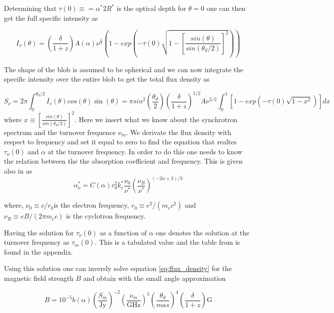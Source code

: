 Determining that $\tau(0) \equiv = \alpha^*2R^*$ is the optical depth for $\theta = 0$ one can then get the full specific intensity as

\begin{equation}
    I_\nu(\theta) = \left( \frac{\delta}{1+z}\right)A(\alpha)\nu^{\frac{5}{2}}\left(1-exp \left(-\tau(0)\sqrt{1-\left[\frac{sin(\theta)}{sin(\theta_d/2)}\right]^2}\right)\right)
\end{equation}

The shape of the blob is assumed to be spherical and we can now integrate the specific intensity over the entire blob to get the total flux density as


\begin{equation}
    \label{eq:flux_density}
    S_\nu = 2\pi \int_0^{\theta_d/2} I_v(\theta)cos(\theta)\sin(\theta) = \pi sin^2(\frac{\theta_d}{2})(\frac{\delta}{1+z})^{1/2}A \nu^{5/2} \int_0^1[1-exp(-\tau(0)\sqrt{1-x^2})]dx
\end{equation}
where $x \equiv \left[\frac{sin(\theta)}{sin(\theta_d/2)}\right]^2$.
Here we insert what we know about the synchrotron spectrum and the turnover frequence $\nu_m$. We derivate the flux density with respect to frequency and set it equal to zero to find the equation that realtes $\tau_\nu(0)$ and $\alpha$ at the turnover frequency. In order to do this one needs to know the relation between the the absorption coefficient and frequency. This is given also in \cite{Hirotani_2005} as 
\begin{equation}
    \alpha_\nu^* = C(\alpha) r_0^2 k_e^*\frac{\nu_0}{\nu^*}(\frac{\nu_B}{\nu^*})^{(-2\alpha +3)/3}
\end{equation} 

where, $\nu_0 \equiv c/r_0$is the electron frequency, $r_0 \equiv e^2/(m_e c^2)$ and  
$\nu_B \equiv eB/(2\pi m_e c)$ is the cyclotron frequency. 

Having the solution for $\tau_\nu(0)$ as a function of $\alpha$ one denotes the solution at the turnover frequency as $\tau_m(0)$. This is a tabulated value and the table from \cite{Hirotani_2005} is found in the appendix.

Using this solution one can inversly solve equation \ref{eq:flux_density} for the magnetic field strength $B$ and obtain with the small angle approximation 

\begin{equation}
    B =   10^{-5} b(\alpha) \left(\frac{S_m}{\text{Jy}}\right)^{-2}\left(\frac{\nu_m}{\text{GHz}}\right)^{5}\left(\frac{\theta_d}{mas}\right)^{4}\left(\frac{\delta}{1+z}\right) \text{G}
\end{equation}

